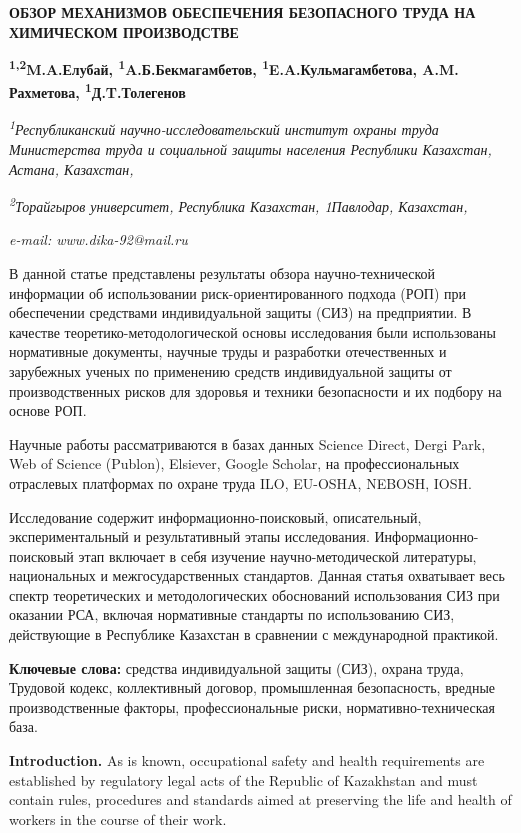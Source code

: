 {{\bfseries ОБЗОР МЕХАНИЗМОВ ОБЕСПЕЧЕНИЯ БЕЗОПАСНОГО ТРУДА НА ХИМИЧЕСКОМ
ПРОИЗВОДСТВЕ}

{\bfseries \textsuperscript{1,2}M.A.Елубай,
\textsuperscript{1}A.Б.Бекмагамбетов,
\textsuperscript{1}E.A.Кульмагамбетова, A.M. Рахметова,
\textsuperscript{1}Д.T.Толегенов\textsuperscript{\envelope }}

\emph{\textsuperscript{1}Республиканский научно-исследовательский
институт охраны труда Министерства труда и социальной защиты населения
Республики Казахстан, Астана, Казахстан,}

\emph{\textsuperscript{2}Торайгыров университет, Республика Казахстан,
1Павлодар, Казахстан,}

\emph{e-mail: www.dika-92@mail.ru}

В данной статье представлены результаты обзора научно-технической
информации об использовании риск-ориентированного подхода (РОП) при
обеспечении средствами индивидуальной защиты (СИЗ) на предприятии. В
качестве теоретико-методологической основы исследования были
использованы нормативные документы, научные труды и разработки
отечественных и зарубежных ученых по применению средств индивидуальной
защиты от производственных рисков для здоровья и техники безопасности и
их подбору на основе РОП.

Научные работы рассматриваются в базах данных Science Direct, Dergi
Park, Web of Science (Publon), Elsiever, Google Scholar, на
профессиональных отраслевых платформах по охране труда ILO, EU-OSHA,
NEBOSH, IOSH.

Исследование содержит информационно-поисковый, описательный,
экспериментальный и результативный этапы исследования.
Информационно-поисковый этап включает в себя изучение
научно-методической литературы, национальных и межгосударственных
стандартов. Данная статья охватывает весь спектр теоретических и
методологических обоснований использования СИЗ при оказании РСА, включая
нормативные стандарты по использованию СИЗ, действующие в Республике
Казахстан в сравнении с международной практикой.

{\bfseries Ключевые слова:} средства индивидуальной защиты (СИЗ), охрана
труда, Трудовой кодекс, коллективный договор, промышленная безопасность,
вредные производственные факторы, профессиональные риски,
нормативно-техническая база.

{\bfseries Introduction.} As is known, occupational safety and health
requirements are established by regulatory legal acts of the Republic of
Kazakhstan and must contain rules, procedures and standards aimed at
preserving the life and health of workers in the course of their work.

}

